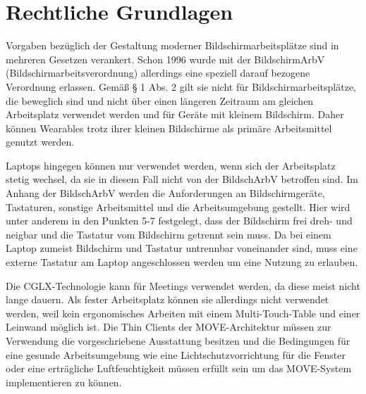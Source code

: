 \newpage
\section{Rechtliche Grundlagen}
Vorgaben bezüglich der Gestaltung moderner Bildschirmarbeitsplätze sind in mehreren Gesetzen verankert. Schon 1996 wurde mit der BildschirmArbV (Bildschirmarbeitsverordnung) allerdings eine speziell darauf bezogene Verordnung erlassen. Gemäß § 1 Abs. 2 gilt sie nicht für Bildschirmarbeitsplätze, die beweglich sind und nicht über einen längeren Zeitraum am gleichen Arbeitsplatz verwendet werden und für Geräte mit kleinem Bildschirm. Daher können Wearables trotz ihrer kleinen Bildschirme als primäre Arbeitsmittel genutzt werden.

Laptops hingegen können nur verwendet werden, wenn sich der Arbeitsplatz stetig wechsel, da sie in diesem Fall nicht von der BildschArbV betroffen sind. Im Anhang der BildschArbV werden die Anforderungen an Bildschirmgeräte, Tastaturen, sonstige Arbeitsmittel und die Arbeitsumgebung gestellt. Hier wird unter anderem in den Punkten 5-7 festgelegt, dass der Bildschirm frei dreh- und neigbar und die Tastatur vom Bildschirm getrennt sein muss. Da bei einem Laptop zumeist Bildschirm und Tastatur untrennbar voneinander sind, muss eine externe Tastatur am Laptop angeschlossen werden um eine Nutzung zu erlauben.

Die CGLX-Technologie kann für Meetings verwendet werden, da diese meist nicht lange dauern. Als fester Arbeitsplatz können sie allerdings nicht verwendet werden, weil kein ergonomisches Arbeiten mit einem Multi-Touch-Table und einer Leinwand möglich ist. Die Thin Clients der MOVE-Architektur müssen zur Verwendung die vorgeschriebene Ausstattung besitzen und die Bedingungen für eine gesunde Arbeitsumgebung wie eine Lichtschutzvorrichtung für die Fenster oder eine erträgliche Luftfeuchtigkeit müssen erfüllt sein um das MOVE-System implementieren zu können.